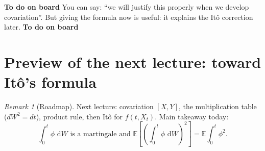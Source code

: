 \documentclass[11pt]{article}
\newcommand{\E}{\mathbb{E}}
\newcommand{\1}{\mathbf{1}}
\newcommand{\dd}{\,\mathrm{d}}
\numberwithin{equation}{section}
\theoremstyle{plain}
\theoremstyle{definition}
\theoremstyle{remark}
\newtheorem{remark}[theorem]{Remark}
\begin{document}
\textbf{To do on board}
You can say: ``we will justify this properly when we develop covariation''.
But giving the formula now is useful: it explains the It\^o correction later.
\textbf{To do on board}

\section{Preview of the next lecture: toward It\^o's formula}

\begin{remark}[Roadmap]
Next lecture: covariation $[X,Y]$, the multiplication table ($dW^2=dt$),
product rule, then It\^o for $f(t,X_t)$.
Main takeaway today:
\[
\int_0^t \phi\,\dd W \text{ is a martingale and }
\E\left[\left(\int_0^t \phi\,\dd W\right)^2\right]=\E\int_0^t \phi^2.
\]
\end{remark}
\end{document}
